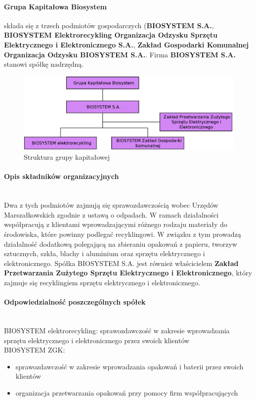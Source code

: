 

\paragraph{Grupa Kapitałowa Biosystem} składa się z trzech podmiotów gospodarczych (\textbf{BIOSYSTEM S.A.}, \textbf{BIOSYSTEM Elektrorecykling Organizacja Odzysku Sprzętu Elektrycznego i Elektronicznego S.A.}, \textbf{Zakład Gospodarki Komunalnej Organizacja Odzysku BIOSYSTEM S.A.}. Firma \textbf{BIOSYSTEM S.A.} stanowi spółkę nadrzędną.

\begin{figure}[H]
	\centering
	\includegraphics[width=\textwidth]{img/group_chart.eps}
	\caption{Struktura grupy kapitałowej}
\end{figure}

\paragraph{Opis składników organizacyjnych} \ \\
Dwa z tych podmiotów zajmują się sprawozdawczością wobec Urzędów Marszałkowskich zgodnie z ustawą o odpadach.
W ramach działalności współpracują z klientami wprowadzającymi różnego rodzaju materiały do środowiska, które powinny podlegać recyklingowi.
W związku z tym prowadzą działalność dodatkową polegającą na zbieraniu opakowań z papieru, tworzyw sztucznych, szkła, blachy i aluminium oraz sprzętu elektrycznego i elektronicznego.
Spółka BIOSYSTEM S.A. jest również właścicielem \textbf{Zakład Przetwarzania Zużytego Sprzętu Elektrycznego i Elektronicznego}, który zajmuje się recyklingiem sprzętu elektrycznego i elektronicznego. 

\paragraph{Odpowiedzialność poszczególnych spółek} \ \\
BIOSYSTEM elektrorecykling: sprawozdawczość w zakresie wprowadzania sprzętu elektrycznego i elektronicznego przez swoich klientów \\
BIOSYSTEM ZGK:
\begin{itemize}
	\item sprawozdawczość w zakresie wprowadzania opakowań i baterii przez swoich klientów
	\item organizacja przetwarzania opakowań przy pomocy firm współpracujących
\end{itemize}

